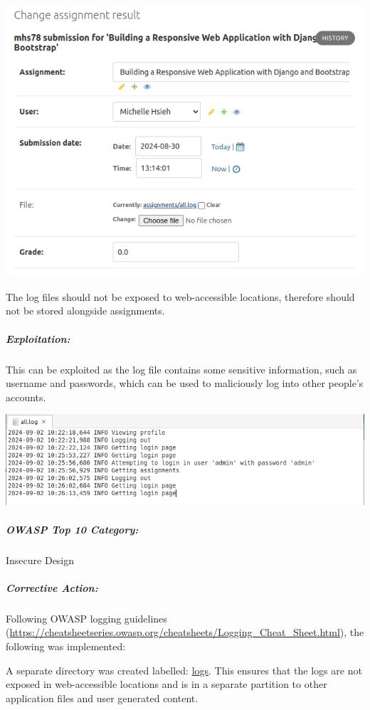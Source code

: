 \begin{center}
    \includegraphics[width = \linewidth]{images/Michelle/logdownloadalt.png}
\end{center}

The log files should not be exposed to web-accessible locations, therefore should not be stored alongside assignments.

\subparagraph{Exploitation:}

This can be exploited as the log file contains some sensitive information, such as username and passwords, which can be used to maliciously log into other people's accounts.

\begin{center}
    \includegraphics[width = \linewidth]{images/Michelle/logfile.png}
\end{center}

\subparagraph{OWASP Top 10 Category:}

Insecure Design

\subparagraph{Corrective Action:}

Following OWASP logging guidelines (\url{https://cheatsheetseries.owasp.org/cheatsheets/Logging_Cheat_Sheet.html}), the following was implemented: 

A separate directory was created labelled: \url{logs}. This ensures that the logs are not exposed in web-accessible locations and is in a separate partition to other application files and user generated content.

